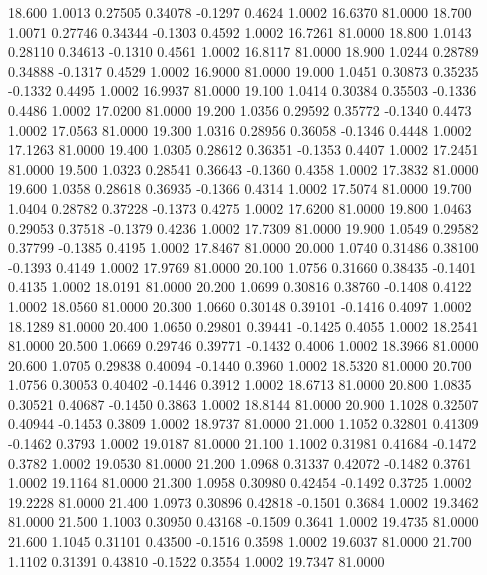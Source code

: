   18.600   1.0013   0.27505   0.34078  -0.1297   0.4624   1.0002  16.6370  81.0000
  18.700   1.0071   0.27746   0.34344  -0.1303   0.4592   1.0002  16.7261  81.0000
  18.800   1.0143   0.28110   0.34613  -0.1310   0.4561   1.0002  16.8117  81.0000
  18.900   1.0244   0.28789   0.34888  -0.1317   0.4529   1.0002  16.9000  81.0000
  19.000   1.0451   0.30873   0.35235  -0.1332   0.4495   1.0002  16.9937  81.0000
  19.100   1.0414   0.30384   0.35503  -0.1336   0.4486   1.0002  17.0200  81.0000
  19.200   1.0356   0.29592   0.35772  -0.1340   0.4473   1.0002  17.0563  81.0000
  19.300   1.0316   0.28956   0.36058  -0.1346   0.4448   1.0002  17.1263  81.0000
  19.400   1.0305   0.28612   0.36351  -0.1353   0.4407   1.0002  17.2451  81.0000
  19.500   1.0323   0.28541   0.36643  -0.1360   0.4358   1.0002  17.3832  81.0000
  19.600   1.0358   0.28618   0.36935  -0.1366   0.4314   1.0002  17.5074  81.0000
  19.700   1.0404   0.28782   0.37228  -0.1373   0.4275   1.0002  17.6200  81.0000
  19.800   1.0463   0.29053   0.37518  -0.1379   0.4236   1.0002  17.7309  81.0000
  19.900   1.0549   0.29582   0.37799  -0.1385   0.4195   1.0002  17.8467  81.0000
  20.000   1.0740   0.31486   0.38100  -0.1393   0.4149   1.0002  17.9769  81.0000
  20.100   1.0756   0.31660   0.38435  -0.1401   0.4135   1.0002  18.0191  81.0000
  20.200   1.0699   0.30816   0.38760  -0.1408   0.4122   1.0002  18.0560  81.0000
  20.300   1.0660   0.30148   0.39101  -0.1416   0.4097   1.0002  18.1289  81.0000
  20.400   1.0650   0.29801   0.39441  -0.1425   0.4055   1.0002  18.2541  81.0000
  20.500   1.0669   0.29746   0.39771  -0.1432   0.4006   1.0002  18.3966  81.0000
  20.600   1.0705   0.29838   0.40094  -0.1440   0.3960   1.0002  18.5320  81.0000
  20.700   1.0756   0.30053   0.40402  -0.1446   0.3912   1.0002  18.6713  81.0000
  20.800   1.0835   0.30521   0.40687  -0.1450   0.3863   1.0002  18.8144  81.0000
  20.900   1.1028   0.32507   0.40944  -0.1453   0.3809   1.0002  18.9737  81.0000
  21.000   1.1052   0.32801   0.41309  -0.1462   0.3793   1.0002  19.0187  81.0000
  21.100   1.1002   0.31981   0.41684  -0.1472   0.3782   1.0002  19.0530  81.0000
  21.200   1.0968   0.31337   0.42072  -0.1482   0.3761   1.0002  19.1164  81.0000
  21.300   1.0958   0.30980   0.42454  -0.1492   0.3725   1.0002  19.2228  81.0000
  21.400   1.0973   0.30896   0.42818  -0.1501   0.3684   1.0002  19.3462  81.0000
  21.500   1.1003   0.30950   0.43168  -0.1509   0.3641   1.0002  19.4735  81.0000
  21.600   1.1045   0.31101   0.43500  -0.1516   0.3598   1.0002  19.6037  81.0000
  21.700   1.1102   0.31391   0.43810  -0.1522   0.3554   1.0002  19.7347  81.0000
